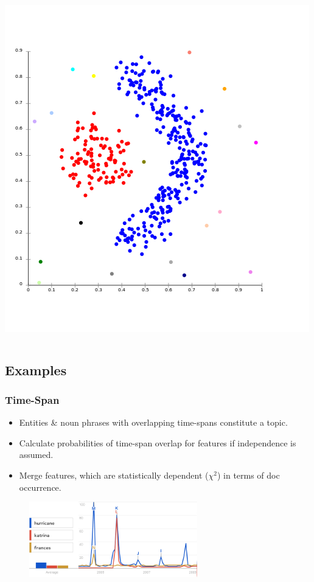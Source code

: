 \documentclass{beamer}
\begin{document}
\begin{frame}
\begin{columns}[c]
			\hfill \\
			\includegraphics[width=\textwidth]{images/cluster_link.png} \\
	\end{columns}
\end{frame}

\subsection{Examples}
\begin{frame}
	\frametitle{Time-Span \citep{Swan:1999:EST:319950.319956}}
	\begin{itemize}
		\item Entities \& noun phrases with overlapping time-spans constitute a topic.
		\item Calculate probabilities of time-span overlap for features if independence is assumed.
		\item Merge features, which are statistically dependent ($\chi^2$) in terms of doc occurrence.
	\end{itemize}
	\begin{figure}[h]
		\centering
		\includegraphics[width=0.65\textwidth]{images/timespan.png}
	\end{figure}
\end{frame}
\end{document}
